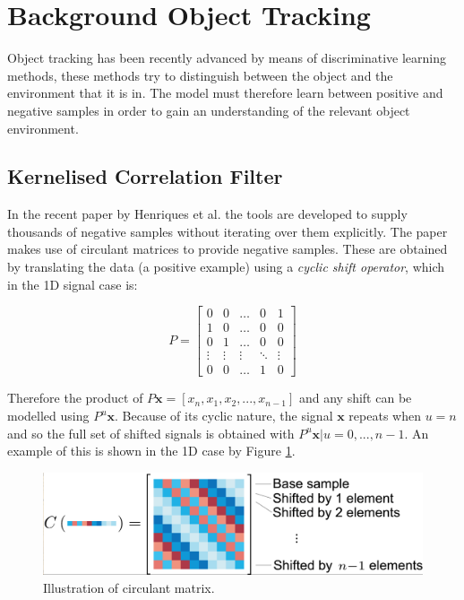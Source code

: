 \documentclass[11pt,twoside]{report}
\begin{document}
\section{Background Object Tracking}

Object tracking has been recently advanced by means of discriminative learning methods, these methods try to distinguish between the object and the environment that it is in. The model must therefore learn between positive and negative samples in order to gain an understanding of the relevant object environment. 

\subsection{Kernelised Correlation Filter} \label{kcf_background}

In the recent paper by Henriques et al. \cite{kcf} the tools are developed to supply thousands of negative samples without iterating over them explicitly. The paper makes use of circulant matrices to provide negative samples. These are obtained by translating the data (a positive example) using a \textit{cyclic shift operator}, which in the 1D signal case is:

\begin{equation}
P = 
\begin{bmatrix}
0 & 0 & \dots & 0 & 1 \\
1 & 0 & \dots & 0 & 0 \\
0 & 1 & \dots & 0 & 0 \\
\vdots & \vdots & \vdots & \ddots & \vdots \\
0 & 0 & \dots & 1 & 0
\end{bmatrix}
\end{equation} 

Therefore the product of $P\mathbf{x} = [x_{n},x_{1},x_{2},...,x_{n-1}]$ and any shift can be modelled using $P^{u}\mathbf{x}$. Because of its cyclic nature, the signal $\mathbf{x}$ repeats when $u=n$ and so the full set of shifted signals is obtained with ${P^{u}\mathbf{x} | u=0,...,n-1}$. An example of this is shown in the 1D case by Figure \ref{circular_data}.

\noindent \begin{figure}[h!]
	\includegraphics[width = 1.0\hsize,trim={0.15cm 0.1cm 0 0},clip]{figures/circular_shift.png}
	\caption{Illustration of circulant matrix.\cite{kcf}}
	\label{circular_data}
\end{figure}
\end{document}
